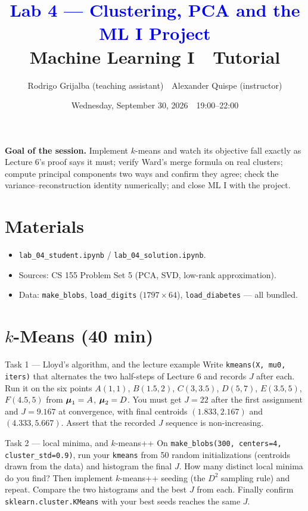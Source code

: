 \documentclass[11pt]{article}
\title{\textcolor{blue}{Lab 4 --- Clustering, PCA and the ML I Project}\\[4pt]
\large Machine Learning I \,\textperiodcentered\, Tutorial}
\author{Rodrigo Grijalba (teaching assistant) \,\textperiodcentered\, Alexander Quispe (instructor)}
\date{Wednesday, September 30, 2026 \,\textperiodcentered\, 19:00--22:00}
\begin{document}
\maketitle

\begin{keypoint}
\textbf{Goal of the session.} Implement $k$-means and watch its objective fall exactly as Lecture 6's
proof says it must; verify Ward's merge formula on real clusters; compute principal components two ways
and confirm they agree; check the variance--reconstruction identity numerically; and close ML I with
the project.
\end{keypoint}

\section*{Materials}
\begin{itemize}[nosep]
  \item \texttt{lab\_04\_student.ipynb} / \texttt{lab\_04\_solution.ipynb}.
  \item Sources: CS 155 Problem Set 5 (PCA, SVD, low-rank approximation).
  \item Data: \texttt{make\_blobs}, \texttt{load\_digits} ($1797\times64$), \texttt{load\_diabetes} --- all bundled.
\end{itemize}

\section{$k$-Means (40 min)}

\begin{task}{Task 1 --- Lloyd's algorithm, and the lecture example}
Write \texttt{kmeans(X, mu0, iters)} that alternates the two half-steps of Lecture 6 and records $J$ after
each. Run it on the six points $A(1,1)$, $B(1.5,2)$, $C(3,3.5)$, $D(5,7)$, $E(3.5,5)$, $F(4.5,5)$ from
$\boldsymbol{\mu}_1=A$, $\boldsymbol{\mu}_2=D$. You must get $J=22$ after the first assignment and $J=9.167$ at convergence, with
final centroids $(1.833,2.167)$ and $(4.333,5.667)$. Assert that the recorded $J$ sequence is non-increasing.
\end{task}

\begin{task}{Task 2 --- local minima, and $k$-means++}
On \texttt{make\_blobs(300, centers=4, cluster\_std=0.9)}, run your \texttt{kmeans} from 50 random
initializations (centroids drawn from the data) and histogram the final $J$. How many distinct local minima
do you find? Then implement $k$-means++ seeding (the $D^2$ sampling rule) and repeat. Compare the two histograms
and the best $J$ from each. Finally confirm \texttt{sklearn.cluster.KMeans} with your best seeds reaches the same $J$.
\end{task}
\end{document}

